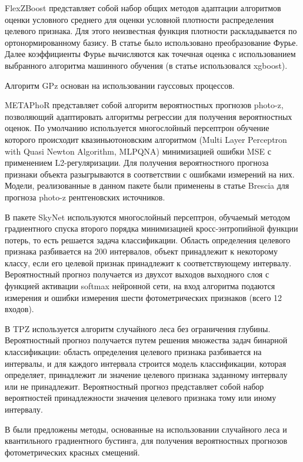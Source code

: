 \documentclass[fleqn,usenatbib]{mnras}
\begin{document}
FlexZBoost \cite{bib:flexzboost} представляет собой набор общих методов адаптации алгоритмов оценки условного среднего для оценки условной плотности распределения целевого признака. Для этого неизвестная функция плотности раскладывается по ортонормированному базису. В статье было использовано преобразование Фурье. Далее коэффициенты Фурье вычисляются как точечная оценка с использованием выбранного алгоритма машинного обучения (в статье использовался xgboost).

Алгоритм GPz \cite{bib:gpz} основан на использовании гауссовых процессов. 

METAPhoR \cite{bib:metaphor} представляет собой алгоритм вероятностных прогнозов photo-z, позволяющий адаптировать алгоритмы регрессии для получения вероятностных оценок. По умолчанию используется многослойный персептрон обучение которого происходит квазиньютоновским алгоритмом (Multi Layer Perceptron with Quasi Newton Algorithm, MLPQNA) минимизацией ошибки MSE с применением L2-регуляризации. Для получения вероятностного прогноза признаки объекта разыгрываются в соответствии с ошибками измерений на них. Модели, реализованные в данном пакете были применены в статье Brescia для прогноза photo-z рентгеновских источников.

В пакете SkyNet \cite{bib:skynet} используются многослойный персептрон, обучаемый методом градиентного спуска второго порядка минимизацией кросс-энтропийной функции потерь, то есть решается задача классификации. Область определения целевого признака разбивается на 200 интервалов, объект принадлежит к некоторому классу, если его целевой признак принадлежит к соответствующему интервалу. Вероятностный прогноз получается из двухсот выходов выходного слоя с функцией активации softmax нейронной сети, на вход алгоритма подаются измерения и ошибки измерения шести фотометрических признаков (всего 12 входов).

В TPZ \cite{bib:tpz} используется алгоритм случайного леса без ограничения глубины. Вероятностный прогноз получается путем решения множества задач бинарной классификации: область определения целевого признака разбивается на интервалы, и для каждого интервала строится модель классификации, которая определяет, принадлежит ли значение целевого признака заданному интервалу или не принадлежит. Вероятностный прогноз представляет собой набор вероятностей принадлежности значения целевого признака тому или иному интервалу.

В \cite{bib:mesch} были предложены методы, основанные на использовании случайного леса и квантильного градиентного бустинга, для получения вероятностных прогнозов фотометрических красных смещений.
\end{document}
